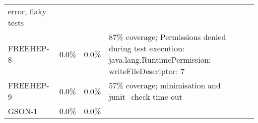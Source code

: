 \begin{tabular}{ l rrrrrrr rrrrrrrr}
{   error, flaky tests}\\ 
FREEHEP-8 & \cellcolor{light-gray} \textcolor{black}{0.0}\% &
                                                              \cellcolor{light-gray}
                                                              \textcolor{black}{0.0}\%
 & \multicolumn{13}{l}{87\% coverage; Permissions denied during test execution:  java.lang.RuntimePermission: writeFileDescriptor: 7}\\ 
FREEHEP-9 & \cellcolor{light-gray} \textcolor{black}{0.0}\% &
                                                              \cellcolor{light-gray}
                                                              \textcolor{black}{0.0}\% 
 & \multicolumn{13}{l}{57\% coverage; minimisation and junit\_check
   time out}\\ 
GSON-1 & \cellcolor{light-gray} \textcolor{black}{0.0}\% &
                                                           \cellcolor{light-gray}
                                                           \textcolor{black}{0.0}\%


\end{tabular}
